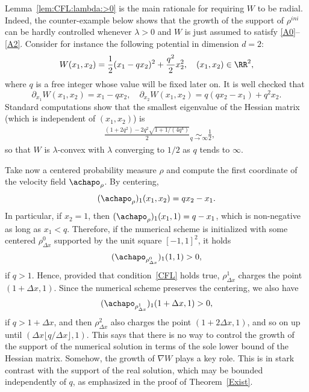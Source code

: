 \begin{rema}
Lemma~\ref{lem:CFL:lambda:>0} is the main rationale for requiring $W$ to be radial. Indeed, the counter-example below shows that the growth of the support of $\rho^{ini}$ can be hardly controlled whenever $\lambda >0$ and $W$ is just assumed to satisfy
\eqref{A0}--\eqref{A2}. Consider for instance the following potential in dimension $d=2$:
\begin{equation*}
W(x_{1},x_{2}) = \frac12 (x_{1} - q x_{2} )^2 + \frac{q^2}2 x_{2}^2, \quad (x_{1},x_{2}) \in \RR^2,
\end{equation*}
where $q$ is a free integer whose value will be fixed later on. It is well checked that
\begin{equation*}
\partial_{x_{1}} W(x_{1},x_{2}) = x_{1}- q x_{2},
\quad \partial_{x_{2}} W(x_{1},x_{2}) = q (q x_{2} - x_{1}) + q^2 x_{2}.
\end{equation*}
Standard computations show that the smallest eigenvalue of the Hessian matrix (which is independent of $(x_{1},x_{2})$) is
\begin{equation*}
\begin{split}
&\frac{(1+2q^2) - 2q^2 \sqrt{1+1/(4q^4)}}{2} \underset{q \rightarrow \infty}{\sim} \frac12,
\end{split}
\end{equation*}
so that $W$ is $\lambda$-convex with $\lambda$ converging to $1/2$ as $q$ tends to $\infty$.

Take now a centered probability measure $\rho$ and compute the first coordinate of the velocity field $\achapo_{\rho}$. By centering,
\begin{equation*}
(\achapo_{\rho})_{1}(x_{1},x_{2}) = qx_{2}- x_{1}.
\end{equation*}
In particular, if $x_{2}=1$, then $(\achapo_{\rho})_{1}(x_{1},1) = q- x_{1}$, which is non-negative as long as $x_{1}< q$. Therefore, if the numerical scheme is initialized with some centered $\rho^0_{\Delta x}$ supported by the unit square $[-1,1]^2$, it holds
\begin{equation*}
(\achapo_{\rho^0_{\Delta x}})_{1}(1,1) >0,
\end{equation*}
if $q>1$. Hence, provided that condition~\eqref{CFL} holds true, $\rho^{1}_{\Delta x}$ charges the point $(1+\Delta x,1)$. Since the numerical scheme preserves the centering, we also have
\begin{equation*}
(\achapo_{\rho^1_{\Delta x}})_{1}(1+\Delta x,1) >0,
\end{equation*}
if $q>1+\Delta x$, and then $\rho^2_{\Delta x}$ also charges the point $(1+2\Delta x,1)$, and so on up until $(\Delta x \lfloor q/\Delta x \rfloor,1)$. This says that there is no way to control the growth of the support of the numerical solution in terms of the sole lower bound of the Hessian matrix. Somehow, the growth of $\nabla W$ plays a key role. This is in stark contrast with the support of the real solution, which may be bounded independently of $q$, as emphasized in the proof of Theorem~\ref{Exist}.


\end{rema}
